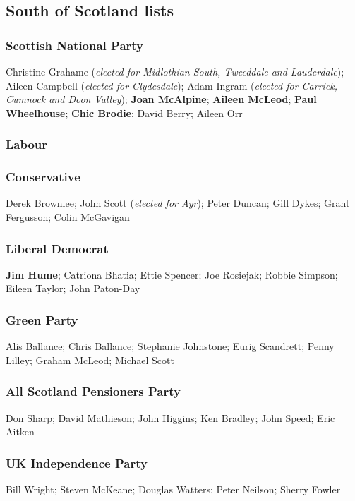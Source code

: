 \eject

\subsection*{South of Scotland lists}

\begin{resultsiii}
\subsubsection*{Scottish National Party}
Christine Grahame (\emph{elected for Midlothian South, Tweeddale and Lauderdale}); Aileen Campbell (\emph{elected for Clydesdale}); Adam Ingram (\emph{elected for Carrick, Cumnock and Doon Valley}); \textbf{Joan McAlpine}; \textbf{Aileen McLeod}; \textbf{Paul Wheelhouse}; \textbf{Chic Brodie}; David Berry; Aileen Orr
\subsubsection*{Labour}
\subsubsection*{Conservative}
Derek Brownlee; John Scott (\emph{elected for Ayr}); Peter Duncan; Gill Dykes; Grant Fergusson; Colin McGavigan
\subsubsection*{Liberal Democrat}
\textbf{Jim Hume}; Catriona Bhatia; Ettie Spencer; Joe Rosiejak; Robbie Simpson; Eileen Taylor; John Paton-Day
\subsubsection*{Green Party}
Alis Ballance; Chris Ballance; Stephanie Johnstone; Eurig Scandrett; Penny Lilley; Graham McLeod; Michael Scott
\subsubsection*{All Scotland Pensioners Party}
Don Sharp; David Mathieson; John Higgins; Ken Bradley; John Speed; Eric Aitken
\subsubsection*{UK Independence Party}
Bill Wright; Steven McKeane; Douglas Watters; Peter Neilson; Sherry Fowler

\end{resultsiii}
